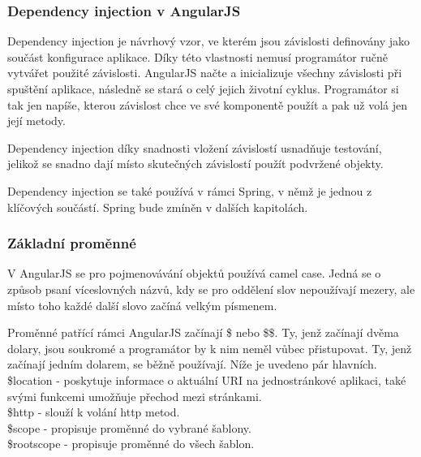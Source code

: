\documentclass[czech,master,public,dept460,male,cpdeclaration,twoside]{diploma}
\begin{document}
\subsubsection{Dependency injection v AngularJS}
Dependency injection je návrhový vzor, ve kterém jsou závislosti definovány jako součást konfigurace aplikace. Díky této vlastnosti nemusí programátor ručně vytvářet použité závislosti. AngularJS načte a inicializuje všechny závislosti při spuštění aplikace, následně se stará o celý jejich životní cyklus. Programátor si tak jen napíše, kterou závislost chce ve své komponentě použít a pak už volá jen její metody.

Dependency injection díky snadnosti vložení závislostí usnadňuje testování, jelikož se snadno dají místo skutečných závislostí použít podvržené objekty.

Dependency injection se také používá v rámci Spring, v němž je jednou z klíčových součástí. Spring bude zmíněn v dalších kapitolách. \cite{LearningAngularjs}

\subsubsection{Základní proměnné}
V AngularJS se pro pojmenovávání objektů používá camel case. Jedná se o způsob psaní víceslovných názvů, kdy se pro oddělení slov nepoužívají mezery, ale místo toho každé další slovo začíná velkým písmenem.

Proměnné patřící rámci AngularJS začínají \$ nebo \$\$. Ty, jenž začínají dvěma dolary, jsou soukromé a programátor by k nim neměl vůbec přistupovat. Ty, jenž začínají jedním dolarem, se běžně používají. Níže je uvedeno pár hlavních.\\
\$location - poskytuje informace o aktuální URI na jednostránkové aplikaci, také svými funkcemi umožňuje přechod mezi stránkami.\\
\$http - slouží k volání http metod.\\
\$scope - propisuje proměnné do vybrané šablony.\\
\$rootscope - propisuje proměnné do všech šablon.
\end{document}
